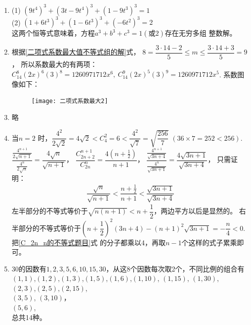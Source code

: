 \begin{enumerate}[label={\textbf{\thechapter.\arabic*}},leftmargin=
    \inteval{\myenumleftmargin}pt]
\item (1) $ \left(9t^4\right)^3+\left(3t-9t^4\right)^3+
\left(1-9t^3\right)^3=1 $ \\
(2) $ \left(1+6t^3\right)^3+\left(1-6t^3\right)^3+
\left(-6t^2\right)^3=2 $ \\
这两个恒等式意味着，方程$a^3+b^3+c^3=1(\text{或}2)$存在无穷多组
整数解。

\item 根据\eqref{二项式系数最大值不等式组的解}式，
$ 8=\dfrac{3\cdot 14-2}{5}\leq m\leq \dfrac{3\cdot 14 +3}{5}=9 $，
所以系数最大的有两项：$ C_{14}^{8}(2x)^6(3)^8=1260971712x^{6},\ 
C_{14}^{9}(2x)^5(3)^9=1260971712x^{5} $. 系数图像如下：
\begin{figure}[h]
    \centering
    \texttt{[image: 二项式系数最大2]}
\end{figure}

\item 略

\item 当$ n=2 $ 时，$ \dfrac{4^2}{2\sqrt{2}}=4\sqrt{2}<
C_4^2=6<\dfrac{4^2}{\sqrt{7}}=\sqrt{\dfrac{256}{7}} $\q 
$ (36\times 7=252<256) $. \\
$ \dfrac{\frac{4^{n+1}}{2\sqrt{n+1}}}
{\frac{4^{n}}{2\sqrt{n}}}=\dfrac{4\sqrt{n}}{\sqrt{n+1}} $，
$ \dfrac{C_{2n+2}^{n+1}}{C_{2n}^{n}}=
\dfrac{4(n+\frac{1}{2})}{n+1} $，
$ \dfrac{\frac{4^{n+1}}{\sqrt{3n+4}}}
{\frac{4^{n}}{\sqrt{3n+1}}}=\dfrac{4\sqrt{3n+1}}{\sqrt{3n+4}} $，
只需证明：
\begin{gather}\label{C_2n_n的不等式题目}
    \dfrac{\sqrt{n}}{\sqrt{n+1}}<\dfrac{n+\frac{1}{2}}{n+1}
    <\dfrac{\sqrt{3n+1}}{\sqrt{3n+4}}
\end{gather}
左半部分的不等式等价于$\sqrt{n(n+1)}<n+\dfrac{1}{2}$，两边平方以后是显然的。
右半部分的不等式等价于$ \left(n+\dfrac{1}{2}\right)^2(3n+4)-
(n+1)^2\sqrt{3n+1}=-\dfrac{n}{4}<0 $. 把\eqref{C_2n_n的不等式题目}式
的分子都乘以4，再取$n-1$个这样的式子累乘即可。

\item 30的因数有$ 1,2,3,5,6,10,15,30 $，从这8个因数每次取2个，不同比例的组合有\\
$ (1,1) $,$ (1,2) $,$ (1,3) $,$ (1,5) $,$ (1,6) $,$(1,10)$,
$ (1,15) $, $(1,30)$,\\
$ (2,3) $,$(2,5)$,$(2,15)$,\\
$ (3,5) $, $(3,10)$，\\
$ (5,6) $,\\
总共14种。


\end{enumerate}

